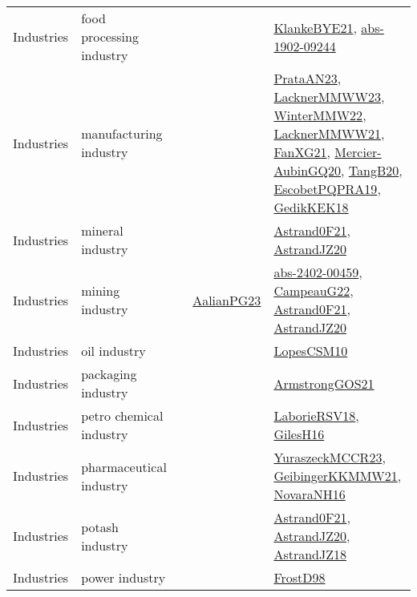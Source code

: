 {\begin{longtable}{llp{6cm}p{6cm}p{6cm}}
Industries & food processing industry &  &  & \href{papers/KlankeBYE21.pdf}{KlankeBYE21}\cite{KlankeBYE21}, \href{articles/abs-1902-09244.pdf}{abs-1902-09244}\cite{abs-1902-09244}\\
Industries & manufacturing industry &  &  & \href{articles/PrataAN23.pdf}{PrataAN23}\cite{PrataAN23}, \href{articles/LacknerMMWW23.pdf}{LacknerMMWW23}\cite{LacknerMMWW23}, \href{papers/WinterMMW22.pdf}{WinterMMW22}\cite{WinterMMW22}, \href{papers/LacknerMMWW21.pdf}{LacknerMMWW21}\cite{LacknerMMWW21}, \href{articles/FanXG21.pdf}{FanXG21}\cite{FanXG21}, \href{papers/Mercier-AubinGQ20.pdf}{Mercier-AubinGQ20}\cite{Mercier-AubinGQ20}, \href{papers/TangB20.pdf}{TangB20}\cite{TangB20}, \href{articles/EscobetPQPRA19.pdf}{EscobetPQPRA19}\cite{EscobetPQPRA19}, \href{articles/GedikKEK18.pdf}{GedikKEK18}\cite{GedikKEK18}\\
Industries & mineral industry &  &  & \href{papers/Astrand0F21.pdf}{Astrand0F21}\cite{Astrand0F21}, \href{articles/AstrandJZ20.pdf}{AstrandJZ20}\cite{AstrandJZ20}\\
Industries & mining industry &  & \href{papers/AalianPG23.pdf}{AalianPG23}\cite{AalianPG23} & \href{articles/abs-2402-00459.pdf}{abs-2402-00459}\cite{abs-2402-00459}, \href{articles/CampeauG22.pdf}{CampeauG22}\cite{CampeauG22}, \href{papers/Astrand0F21.pdf}{Astrand0F21}\cite{Astrand0F21}, \href{articles/AstrandJZ20.pdf}{AstrandJZ20}\cite{AstrandJZ20}\\
Industries & oil industry &  &  & \href{articles/LopesCSM10.pdf}{LopesCSM10}\cite{LopesCSM10}\\
Industries & packaging industry &  &  & \href{papers/ArmstrongGOS21.pdf}{ArmstrongGOS21}\cite{ArmstrongGOS21}\\
Industries & petro chemical industry &  &  & \href{articles/LaborieRSV18.pdf}{LaborieRSV18}\cite{LaborieRSV18}, \href{papers/GilesH16.pdf}{GilesH16}\cite{GilesH16}\\
Industries & pharmaceutical industry &  &  & \href{articles/YuraszeckMCCR23.pdf}{YuraszeckMCCR23}\cite{YuraszeckMCCR23}, \href{papers/GeibingerKKMMW21.pdf}{GeibingerKKMMW21}\cite{GeibingerKKMMW21}, \href{articles/NovaraNH16.pdf}{NovaraNH16}\cite{NovaraNH16}\\
Industries & potash industry &  &  & \href{papers/Astrand0F21.pdf}{Astrand0F21}\cite{Astrand0F21}, \href{articles/AstrandJZ20.pdf}{AstrandJZ20}\cite{AstrandJZ20}, \href{papers/AstrandJZ18.pdf}{AstrandJZ18}\cite{AstrandJZ18}\\
Industries & power industry &  &  & \href{papers/FrostD98.pdf}{FrostD98}\cite{FrostD98}\\

\end{longtable}}
